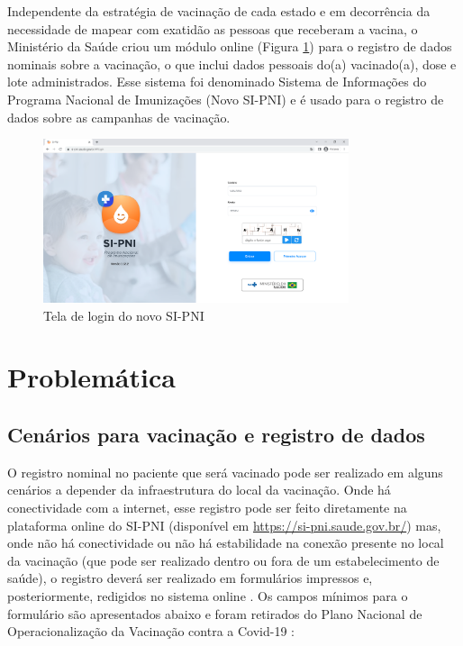 Independente da estratégia de vacinação de cada estado e em decorrência da necessidade de mapear com exatidão as pessoas que receberam a vacina, o Ministério da Saúde criou um módulo online (Figura \ref{fig:sipni_login}) para o registro de dados nominais sobre a vacinação, o que inclui dados pessoais do(a) vacinado(a), dose e lote administrados. Esse sistema foi denominado Sistema de Informações do Programa Nacional de Imunizações (Novo SI-PNI) e é usado para o registro de dados sobre as campanhas de vacinação.

\begin{figure}[!ht]
  \centering
  \includegraphics[width=0.8\textwidth]{figuras/cap1/1_1_pagina_login_sipni.png}
  \caption{Tela de login do novo SI-PNI}
  \label{fig:sipni_login}
\end{figure}

\section{Problemática}
\label{cap1:Sec:Problematica}
\subsection{Cenários para vacinação e registro de dados}
\label{cap1:SubSec:CenariosVacinacao}
O registro nominal no paciente que será vacinado pode ser realizado em alguns cenários a depender da infraestrutura do local da vacinação. Onde há conectividade com a internet, esse registro pode ser feito diretamente na plataforma online do SI-PNI (disponível em \url{https://si-pni.saude.gov.br/}) mas, onde não há conectividade ou não há estabilidade na conexão presente no local da vacinação (que pode ser realizado dentro ou fora de um estabelecimento de saúde), o registro deverá ser realizado em formulários impressos e, posteriormente, redigidos no sistema online \cite{ministerio2022plano}. Os campos mínimos para o formulário são apresentados abaixo e foram retirados do Plano Nacional de Operacionalização da Vacinação contra a Covid-19 \cite{ministerio2022plano}:

